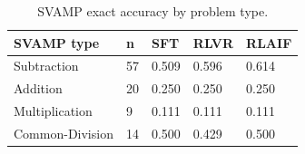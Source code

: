 \begin{table}[t]
\centering
\small
\caption{SVAMP exact accuracy by problem type.}
\begin{tabular}{lllll}
\toprule
SVAMP type & n & SFT & RLVR & RLAIF \\
\midrule
Subtraction & 57 & 0.509 & 0.596 & 0.614 \\
Addition & 20 & 0.250 & 0.250 & 0.250 \\
Multiplication & 9 & 0.111 & 0.111 & 0.111 \\
Common-Division & 14 & 0.500 & 0.429 & 0.500 \\
\bottomrule
\end{tabular}
\end{table}
